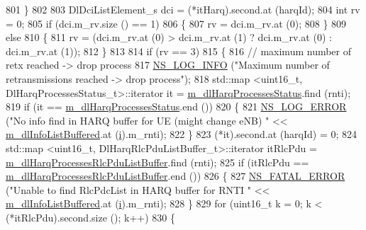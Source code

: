 \begin{DoxyCode}
801             \}
802 
803           DlDciListElement\_s dci = (*itHarq).second.at (harqId);
804           \textcolor{keywordtype}{int} rv = 0;
805           \textcolor{keywordflow}{if} (dci.m\_rv.size () == 1)
806             \{
807               rv = dci.m\_rv.at (0);
808             \}
809           \textcolor{keywordflow}{else}
810             \{
811               rv = (dci.m\_rv.at (0) > dci.m\_rv.at (1) ? dci.m\_rv.at (0) : dci.m\_rv.at (1));
812             \}
813 
814           \textcolor{keywordflow}{if} (rv == 3)
815             \{
816               \textcolor{comment}{// maximum number of retx reached -> drop process}
817               \hyperlink{group__logging_gafbd73ee2cf9f26b319f49086d8e860fb}{NS\_LOG\_INFO} (\textcolor{stringliteral}{"Maximum number of retransmissions reached -> drop process"});
818               std::map <uint16\_t, DlHarqProcessesStatus\_t>::iterator it = 
      \hyperlink{classns3_1_1TtaFfMacScheduler_a7fca472047b1f964ac6e2b992ed93f66}{m\_dlHarqProcessesStatus}.find (rnti);
819               \textcolor{keywordflow}{if} (it == \hyperlink{classns3_1_1TtaFfMacScheduler_a7fca472047b1f964ac6e2b992ed93f66}{m\_dlHarqProcessesStatus}.end ())
820                 \{
821                   \hyperlink{group__logging_ga0261a8db1d4ac5f79417d117634fd455}{NS\_LOG\_ERROR} (\textcolor{stringliteral}{"No info find in HARQ buffer for UE (might change eNB) "} << 
      \hyperlink{classns3_1_1TtaFfMacScheduler_af7afa3d5a610456175b21bad17cc04ae}{m\_dlInfoListBuffered}.at (\hyperlink{bernuolliDistribution_8m_a6f6ccfcf58b31cb6412107d9d5281426}{i}).m\_rnti);
822                 \}
823               (*it).second.at (harqId) = 0;
824               std::map <uint16\_t, DlHarqRlcPduListBuffer\_t>::iterator itRlcPdu =  
      \hyperlink{classns3_1_1TtaFfMacScheduler_a04e2e36b8114bfe977b8a3443822d7f1}{m\_dlHarqProcessesRlcPduListBuffer}.find (rnti);
825               \textcolor{keywordflow}{if} (itRlcPdu == \hyperlink{classns3_1_1TtaFfMacScheduler_a04e2e36b8114bfe977b8a3443822d7f1}{m\_dlHarqProcessesRlcPduListBuffer}.end ())
826                 \{
827                   \hyperlink{group__fatal_ga5131d5e3f75d7d4cbfd706ac456fdc85}{NS\_FATAL\_ERROR} (\textcolor{stringliteral}{"Unable to find RlcPdcList in HARQ buffer for RNTI "} << 
      \hyperlink{classns3_1_1TtaFfMacScheduler_af7afa3d5a610456175b21bad17cc04ae}{m\_dlInfoListBuffered}.at (\hyperlink{bernuolliDistribution_8m_a6f6ccfcf58b31cb6412107d9d5281426}{i}).m\_rnti);
828                 \}
829               \textcolor{keywordflow}{for} (uint16\_t k = 0; k < (*itRlcPdu).second.size (); k++)
830                 \{

\end{DoxyCode}
